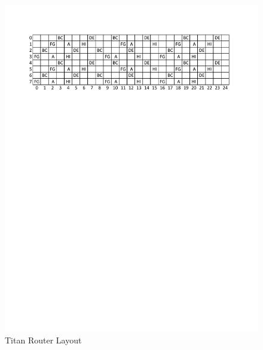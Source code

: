 \begin{figure}[t]
  \begin{center}
    \includegraphics{figures/titanplacement}
    \caption{Titan Router Layout}\label{fig:titanlayout}
  \end{center}
\end{figure}


